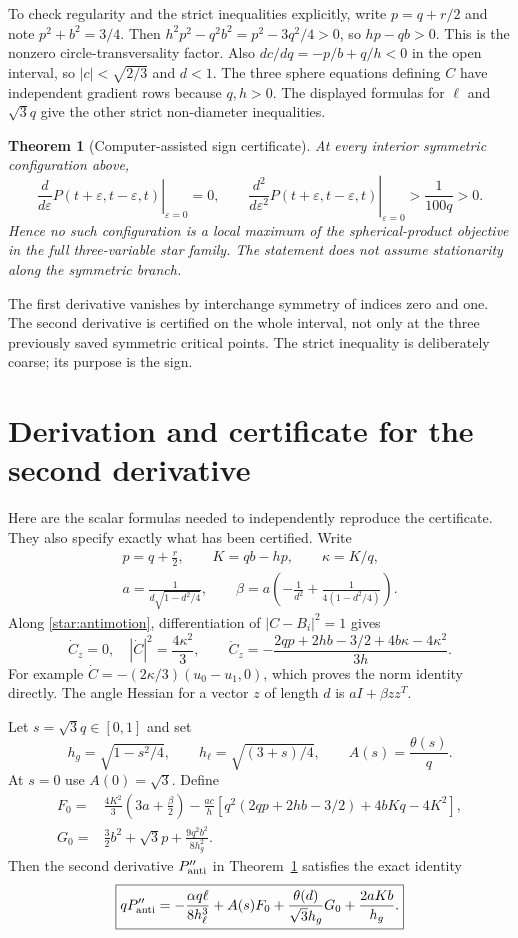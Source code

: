 \documentclass[11pt]{article}
\newtheorem{theorem}{Theorem}[section]
\theoremstyle{remark}\newtheorem{remark}[theorem]{Remark}
\begin{document}
To check regularity and the strict inequalities explicitly, write
$p=q+r/2$ and note $p^2+b^2=3/4$. Then
$h^2p^2-q^2b^2=p^2-3q^2/4>0$, so $hp-qb>0$.
This is the nonzero circle-transversality factor.
Also $dc/dq=-p/b+q/h<0$ in the open interval, so $|c|<\sqrt{2/3}$
and $d<1$. The three sphere equations defining $C$ have independent
gradient rows because $q,h>0$. The displayed formulas for $\ell$
and $\sqrt3q$ give the other strict non-diameter inequalities.

\begin{theorem}[Computer-assisted sign certificate]\label{star:main}
At every interior symmetric configuration above,
\[
 \left.\frac{d}{d\varepsilon}P(t+\varepsilon,t-\varepsilon,t)
 \right|_{\varepsilon=0}=0,
 \qquad
 \left.\frac{d^2}{d\varepsilon^2}P(t+\varepsilon,t-\varepsilon,t)
 \right|_{\varepsilon=0}>\frac{1}{100q}>0.
\]
Hence no such configuration is a local maximum of the spherical-product
objective in the full three-variable star family. The statement does
not assume stationarity along the symmetric branch.
\end{theorem}

The first derivative vanishes by interchange symmetry of indices
zero and one. The second derivative is certified on the whole interval,
not only at the three previously saved symmetric critical points.
The strict inequality is deliberately coarse; its purpose is the sign.

\section{Derivation and certificate for the second derivative}
Here are the scalar formulas needed to independently reproduce the
certificate. They also specify exactly what has been certified.
Write
\begin{gather*}
 p=q+\frac r2,\qquad K=qb-hp,\qquad \kappa=K/q,\\
 a=\frac1{d\sqrt{1-d^2/4}},\qquad
 \beta=a\left(-\frac1{d^2}+\frac1{4(1-d^2/4)}\right).
\end{gather*}
Along \eqref{star:antimotion}, differentiation of $|C-B_i|^2=1$ gives
\[
 \dot C_z=0,\quad |\dot C|^2=\frac{4\kappa^2}{3},\qquad
 \ddot C_z=-\frac{2qp+2hb-3/2+4b\kappa-4\kappa^2}{3h}.
\]
For example $\dot C=-(2\kappa/3)(u_0-u_1,0)$, which proves the
norm identity directly. The angle Hessian for a vector $z$ of length
$d$ is $aI+\beta zz^T$.

Let $s=\sqrt3q\in[0,1]$ and set
\[
 h_g=\sqrt{1-s^2/4},\qquad h_\ell=\sqrt{(3+s)/4},
 \qquad A(s)=\frac{\theta(s)}q.
\]
At $s=0$ use $A(0)=\sqrt3$. Define
\begin{align*}
 F_0={}&\frac{4K^2}{3}\left(3a+\frac\beta2\right)
 -\frac{ac}{h}\left[q^2(2qp+2hb-3/2)+4bKq-4K^2\right],\\
 G_0={}&\frac32b^2+\sqrt3p+\frac{9q^2b^2}{8h_g^2}.
\end{align*}
Then the second derivative $P''_{\rm anti}$ in Theorem~\ref{star:main}
satisfies the exact identity
\begin{equation}\label{star:scaledformula}
 \boxed{qP''_{\rm anti}=
 -\frac{\alpha q\ell}{8h_\ell^3}
 +A(s)F_0+\frac{\theta(d)}{\sqrt3h_g}G_0
 +\frac{2aKb}{h_g}.}
\end{equation}
\end{document}
